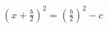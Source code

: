 \documentclass[preview]{standalone}
\begin{document}
\begin{align*}
(x + \frac{b}{2})^2 = (\frac{b}{2})^2 - c
\end{align*}
\end{document}

